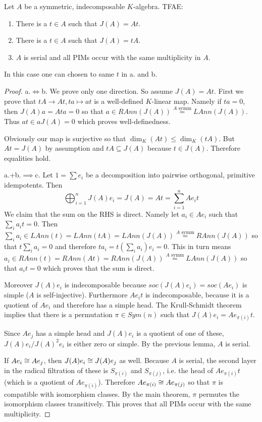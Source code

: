\documentclass[fontsize=11pt,fleqn,a4paper]{scrartcl}
\begin{document}
\begin{lemma}[11.3.8]
Let $A$ be a symmetric, indecomposable $K$-algebra. TFAE:
\begin{enumerate}
\item There is a $t \in A$ such that $J(A)=At$.
\item There is a $t \in A$ such that $J(A)=tA$.
\item $A$ is serial and all PIMs occur with the same multiplicity in $A$.
\end{enumerate}
In this case one can chosen to same $t$ in a. and b.
\end{lemma}
\begin{proof}
a.$\iff$b. We prove only one direction. So assume $J(A)=At$. First we prove that $tA\to At, ta \mapsto at$ is a well-defined $K$-linear map. Namely if $ta=0$, then $J(A)a = Ata = 0$ so that $a\in RAnn(J(A)) \overset{A\text{ symm}}{=} LAnn(J(A))$. Thus $at\in aJ(A)=0$ which proves well-definedness.

Obviously our map is surjective so that $\dim_K(At) \leq \dim_K(tA)$. But $At=J(A)$ by assumption and $tA \subseteq J(A)$ because $t\in J(A)$. Therefore equalities hold.

\medbreak
a.+b.$\implies$c. Let $1=\sum e_i$ be a decomposition into pairwise orthogonal, primitive idempotents. Then
\[\bigoplus_{i=1}^n J(A)e_i = J(A) = At = \sum_{i=1}^n Ae_i t\]
We claim that the sum on the RHS is direct. Namely let $a_i\in Ae_i$ such that $\sum_i a_i t = 0$. Then $\sum_i a_i \in LAnn(t) = LAnn(tA) = LAnn(J(A)) \overset{A\text{ symm}}{=} RAnn(J(A))$ so that $t\sum_i a_i = 0$ and therefore $ta_i = t(\sum_i a_i)e_i = 0$. This in turn means $a_i\in RAnn(t) = RAnn(At) = RAnn(J(A)) \overset{A\text{ symm}}{=} LAnn(J(A))$ so that $a_i t=0$ which proves that the sum is direct.

\smallbreak
Moreover $J(A)e_i$ is indecomposable because $soc(J(A)e_i) = soc(Ae_i)$ is simple ($A$ is self-injective). Furthermore $Ae_i t$ is indecomposable, because it is a quotient of $Ae_i$ and therefore has a simple head. The Krull-Schmidt theorem implies that there is a permutation $\pi\in Sym(n)$ such that $J(A)e_i =Ae_{\pi(i)}t$.

Since $Ae_j$ has a simple head and $J(A)e_i$ is a quotient of one of these, $J(A)e_i / J(A)^2 e_i$ is either zero or simple. By the previous lemma, $A$ is serial.

\smallbreak
If $Ae_i \cong Ae_j$, then $J(A)e_i \cong J(A)e_j$ as well. Because $A$ is serial, the second layer in the radical filtration of these is $S_{\pi(i)}$ and $S_{\pi(j)}$, i.e. the head of $Ae_{\pi(i)}t$ (which is a quotient of $Ae_{\pi(i)}$). Therefore $Ae_{\pi(i)} \cong Ae_{\pi(j)}$ so that $\pi$ is compatible with isomorphism classes. By the main theorem, $\pi$ permutes the isomorphism classes transitively. This proves that all PIMs occur with the same multiplicity.


\end{proof}
\end{document}
